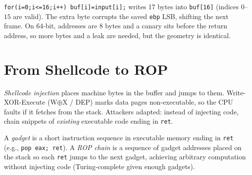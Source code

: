 \begin{example}
\texttt{for(i=0;i<=16;i++) buf[i]=input[i];} writes 17 bytes into \texttt{buf[16]} (indices $0$--$15$ are valid). The extra byte corrupts the saved \texttt{ebp} LSB, shifting the next frame. On 64-bit, addresses are 8 bytes and a canary sits before the return address, so more bytes and a leak are needed, but the geometry is identical.
\end{example}

\section{From Shellcode to ROP}
\label{sec:rop}
\emph{Shellcode injection} places machine bytes in the buffer and jumps to them. Write-XOR-Execute (W$\oplus$X / DEP) marks data pages non-executable, so the CPU faults if it fetches from the stack. Attackers adapted: instead of injecting code, chain snippets of \emph{existing} executable code ending in \texttt{ret}.

\begin{definition}
A \emph{gadget} is a short instruction sequence in executable memory ending in \texttt{ret} (e.g., \texttt{pop eax; ret}). A \emph{ROP chain} is a sequence of gadget addresses placed on the stack so each \texttt{ret} jumps to the next gadget, achieving arbitrary computation without injecting code (Turing-complete given enough gadgets).
\end{definition}

